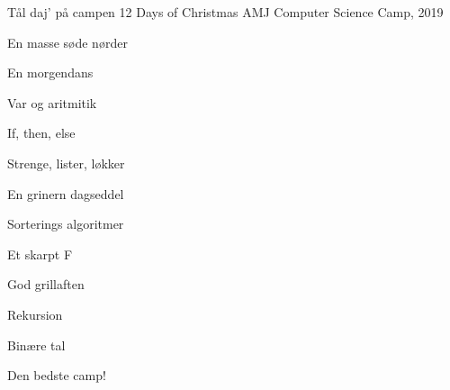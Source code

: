 \begin{song}{Tål daj' på campen}
  {} %
  {12 Days of Christmas} %
  {AMJ} %
  {Computer Science Camp, 2019} %
  {\NotCCLIed} %

  \let\oldSBVerseCnt\theSBVerseCnt

  \renewcommand{\theSBVerseCnt}{$\texttt{l[\oldSBVerseCnt]}$}
  \begin{SBVerse}
    En masse søde nørder
  \end{SBVerse}

  \begin{SBVerse}
    En morgendans
  \end{SBVerse}

  \begin{SBVerse}
    Var og aritmitik
  \end{SBVerse}

  \begin{SBVerse}
    If, then, else
  \end{SBVerse}
  
  \begin{SBVerse}
    Strenge, lister, løkker
  \end{SBVerse}
  
  \begin{SBVerse}
    En grinern dagseddel
  \end{SBVerse}

  \begin{SBVerse}
    Sorterings algoritmer
  \end{SBVerse}

  \begin{SBVerse}
    Et skarpt F
  \end{SBVerse}
  
  \begin{SBVerse}
    God grillaften
  \end{SBVerse}
  
  \begin{SBVerse}
    Rekursion
  \end{SBVerse}
  
  \begin{SBVerse}
    Binære tal
  \end{SBVerse}

  \begin{SBVerse}
    Den bedste camp!
  \end{SBVerse}


\end{song}
